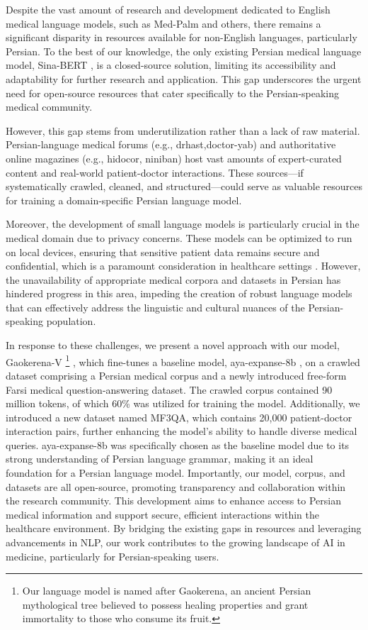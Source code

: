 \documentclass[conference]{IEEEtran}
\begin{document}
	Despite the vast amount of research and development dedicated to English medical language models, such as Med-Palm
	\cite{b2} \cite{b3}
	and others, there remains a significant disparity in resources available for non-English languages, particularly Persian. To the best of our knowledge, the only existing Persian medical language model, Sina-BERT
	\cite{b4}
	, is a closed-source solution, limiting its accessibility and adaptability for further research and application. This gap underscores the urgent need for open-source resources that cater specifically to the Persian-speaking medical community.
	
	However, this gap stems from underutilization rather than a lack of raw material. Persian-language medical forums (e.g., drhast,doctor-yab) and authoritative online magazines (e.g., hidocor, niniban) host vast amounts of expert-curated content and real-world patient-doctor interactions. These sources—if systematically crawled, cleaned, and structured—could serve as valuable resources for training a domain-specific Persian language model.
	
	Moreover, the development of small language models is particularly crucial in the medical domain due to privacy concerns. These models can be optimized to run on local devices, ensuring that sensitive patient data remains secure and confidential, which is a paramount consideration in healthcare settings \cite{b5}.
 However, the unavailability of appropriate medical corpora and datasets in Persian has hindered progress in this area, impeding the creation of robust language models that can effectively address the linguistic and cultural nuances of the Persian-speaking population.
	
	In response to these challenges, we present a novel approach with our model, Gaokerena-V
	\footnote{
		Our language model is named after Gaokerena, an ancient Persian mythological tree believed to possess healing properties and grant immortality to those who consume its fruit.
	}
	, which fine-tunes a baseline model, aya-expanse-8b \cite{b6}, on a crawled dataset comprising a Persian medical corpus and a newly introduced free-form Farsi medical question-answering dataset. The crawled corpus contained 90 million tokens, of which 60\% was utilized for training the model. Additionally, we introduced a new dataset named MF3QA, which contains 20,000 patient-doctor interaction pairs, further enhancing the model’s ability to handle diverse medical queries. aya-expanse-8b was specifically chosen as the baseline model due to its strong understanding of Persian language grammar, making it an ideal foundation for a Persian language model. Importantly, our model, corpus, and datasets are all open-source, promoting transparency and collaboration within the research community. This development aims to enhance access to Persian medical information and support secure, efficient interactions within the healthcare environment. By bridging the existing gaps in resources and leveraging advancements in NLP, our work contributes to the growing landscape of AI in medicine, particularly for Persian-speaking users.
\end{document}
